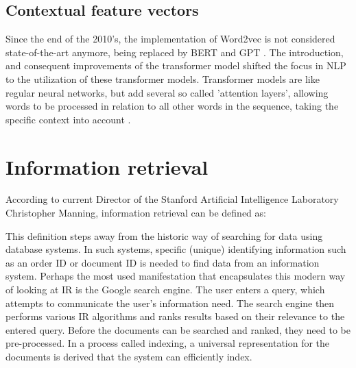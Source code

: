 \documentclass[twoside]{uva-inf-bachelor-thesis}
\begin{document}
\subsection{Contextual feature vectors}

Since the end of the 2010's, the implementation of Word2vec is not considered state-of-the-art anymore, being replaced by BERT \cite{devlin19} and GPT \cite{brown20}. The introduction, and consequent improvements of the transformer model shifted the focus in NLP to the utilization of these transformer models. Transformer models are like regular neural networks, but add several so called 'attention layers', allowing words to be processed in relation to all other words in the sequence, taking the specific context into account \cite{vaswani17, vondermosel22}.

\section{Information retrieval} \label{retrievalSection}
According to current Director of the Stanford Artificial Intelligence Laboratory Christopher Manning, information retrieval can be defined as: 

\cite{manning08IR}

This definition steps away from the historic way of searching for data using database systems. In such systems, specific (unique) identifying information such as an order ID or document ID is needed to find data from an information system. Perhaps the most used manifestation that encapsulates this modern way of looking at IR is the Google search engine. The user enters a query, which attempts to communicate the user's information need. The search engine then performs various IR algorithms and ranks results based on their relevance to the entered query. Before the documents can be searched and ranked, they need to be pre-processed. In a process called indexing, a universal representation for the documents is derived that the system can efficiently index.
\end{document}
